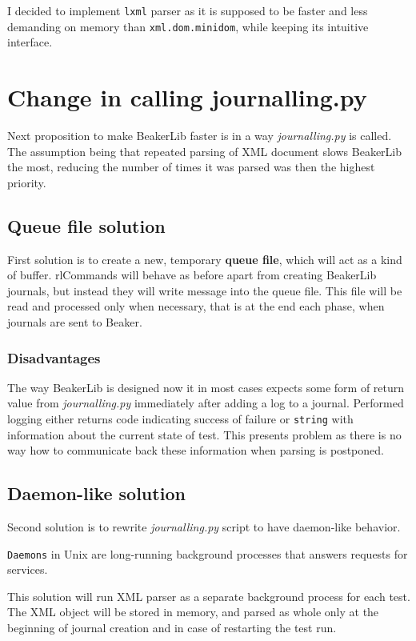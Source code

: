 I decided to implement \texttt{lxml} parser as it is supposed to be faster and less demanding on memory than \texttt{xml.dom.minidom}\cite{lxml_performance}, while keeping its intuitive interface.

\section{Change in calling journalling.py}
Next proposition to make BeakerLib faster is in a way \textit{journalling.py} is called. The assumption being that repeated parsing of XML document slows BeakerLib the most, reducing the number of times it was parsed was then the highest priority. 

\subsection{Queue file solution}  %
First solution is to create a new, temporary \textbf{queue file}, which will act as a kind of buffer. \mbox{rlCommands} will behave as before apart from creating BeakerLib journals, but instead they will write message into the queue file. This file will be read and processed only when necessary, that is at the end each phase, when journals are sent to Beaker.

\subsubsection{Disadvantages}
The way BeakerLib is designed now it in most cases expects some form of return value from \textit{journalling.py} immediately after adding a log to a journal. Performed logging either returns code indicating success of failure or \texttt{string} with information about the current state of test. This presents problem as there is no way how to communicate back these information when parsing is postponed. 

\subsection{Daemon-like solution}
Second solution is to rewrite \textit{journalling.py} script to have daemon-like behavior. 

\texttt{Daemons} in Unix are long-running background processes that answers requests for services\cite{daemon_explanation}.

This solution will run XML parser as a separate background process for each test. The XML object will be stored in memory, and parsed as whole only at the beginning of journal creation and in case of restarting the test run.  

